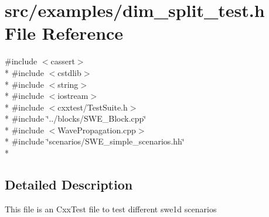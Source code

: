 \section{src/examples/dim\-\_\-split\-\_\-test.h File Reference}
\label{dim__split__test_8h}
{\ttfamily \#include $<$cassert$>$}\\*
{\ttfamily \#include $<$cstdlib$>$}\\*
{\ttfamily \#include $<$string$>$}\\*
{\ttfamily \#include $<$iostream$>$}\\*
{\ttfamily \#include $<$cxxtest/\-Test\-Suite.\-h$>$}\\*
{\ttfamily \#include \char`\"{}../blocks/\-S\-W\-E\-\_\-\-Block.\-cpp\char`\"{}}\\*
{\ttfamily \#include $<$Wave\-Propagation.\-cpp$>$}\\*
{\ttfamily \#include \char`\"{}scenarios/\-S\-W\-E\-\_\-simple\-\_\-scenarios.\-hh\char`\"{}}\\*


\subsection{Detailed Description}
This file is an Cxx\-Test file to test different swe1d scenarios 